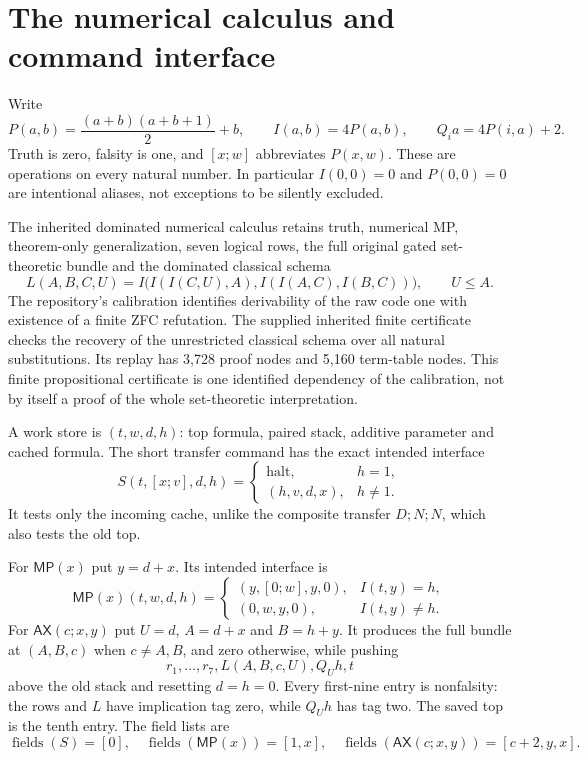\documentclass[11pt]{article}
\newcommand{\MP}{\mathsf{MP}}
\newcommand{\AX}{\mathsf{AX}}
\begin{document}
\section{The numerical calculus and command interface}
Write
\[
 P(a,b)=\frac{(a+b)(a+b+1)}2+b,\qquad
 I(a,b)=4P(a,b),\qquad Q_i a=4P(i,a)+2.
\]
Truth is zero, falsity is one, and $[x;w]$ abbreviates $P(x,w)$. These are operations on every natural number. In particular $I(0,0)=0$ and $P(0,0)=0$ are intentional aliases, not exceptions to be silently excluded.

The inherited dominated numerical calculus retains truth, numerical MP, theorem-only generalization, seven logical rows, the full original gated set-theoretic bundle and the dominated classical schema
\[
 L(A,B,C,U)=
 I\bigl(I(I(C,U),A), I(I(A,C),I(B,C))\bigr),\qquad U\le A.
\]
The repository's calibration identifies derivability of the raw code one with existence of a finite ZFC refutation. The supplied inherited finite certificate checks the recovery of the unrestricted classical schema over all natural substitutions. Its replay has 3,728 proof nodes and 5,160 term-table nodes. This finite propositional certificate is one identified dependency of the calibration, not by itself a proof of the whole set-theoretic interpretation.

A work store is $(t,w,d,h)$: top formula, paired stack, additive parameter and cached formula. The short transfer command has the exact intended interface
\[
 S(t,[x;v],d,h)=
 \begin{cases}
 \mathrm{halt},&h=1,\\
 (h,v,d,x),&h\ne1.
 \end{cases}
\]
It tests only the incoming cache, unlike the composite transfer $D;N;N$, which also tests the old top.

For $\MP(x)$ put $y=d+x$. Its intended interface is
\[
 \MP(x)(t,w,d,h)=
 \begin{cases}
 (y,[0;w],y,0),&I(t,y)=h,\\
 (0,w,y,0),&I(t,y)\ne h.
 \end{cases}
\]
For $\AX(c;x,y)$ put $U=d$, $A=d+x$ and $B=h+y$. It produces the full bundle at $(A,B,c)$ when $c\ne A,B$, and zero otherwise, while pushing
\[
 r_1,\ldots,r_7,L(A,B,c,U),Q_Uh,t
\]
above the old stack and resetting $d=h=0$. Every first-nine entry is nonfalsity: the rows and $L$ have implication tag zero, while $Q_Uh$ has tag two. The saved top is the tenth entry. The field lists are
\[
 \operatorname{fields}(S)=[0],\quad
 \operatorname{fields}(\MP(x))=[1,x],\quad
 \operatorname{fields}(\AX(c;x,y))=[c+2,y,x].
\]
\end{document}
